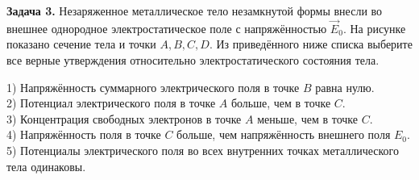 \begin{taskbasic}[code={\label{task:elem_cap_v7_n14}}]
\textbf{Задача 3.} Незаряженное металлическое тело незамкнутой формы внесли во внешнее однородное электростатическое поле с напряжённостью $\vec{E}_0$. На рисунке показано сечение тела и точки $A, B, C, D$. Из приведённого ниже списка выберите все верные утверждения относительно электростатического состояния тела.

\nopagebreak\smallskip
\begin{center}
\end{center}

1) Напряжённость суммарного электрического поля в точке $B$ равна нулю.\\
2) Потенциал электрического поля в точке $A$ больше, чем в точке $C$.\\
3) Концентрация свободных электронов в точке $A$ меньше, чем в точке $C$.\\
4) Напряжённость поля в точке $C$ больше, чем напряжённость внешнего поля $E_0$.\\
5) Потенциалы электрического поля во всех внутренних точках металлического тела одинаковы.

\end{taskbasic}

